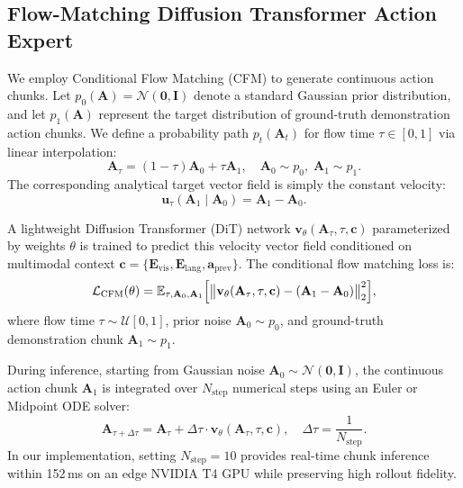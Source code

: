 \subsection{Flow-Matching Diffusion Transformer Action Expert}
We employ Conditional Flow Matching (CFM) \cite{peebles2023scalable,black2024pi_0} to generate continuous action chunks. Let $p_0(\mathbf{A}) = \mathcal{N}(\mathbf{0}, \mathbf{I})$ denote a standard Gaussian prior distribution, and let $p_1(\mathbf{A})$ represent the target distribution of ground-truth demonstration action chunks. We define a probability path $p_t(\mathbf{A}_t)$ for flow time $\tau \in [0, 1]$ via linear interpolation:
\begin{equation}
\mathbf{A}_\tau = (1 - \tau)\mathbf{A}_0 + \tau \mathbf{A}_1, \quad \mathbf{A}_0 \sim p_0, \; \mathbf{A}_1 \sim p_1.
\end{equation}
The corresponding analytical target vector field is simply the constant velocity:
\begin{equation}
\mathbf{u}_\tau(\mathbf{A}_1 \mid \mathbf{A}_0) = \mathbf{A}_1 - \mathbf{A}_0.
\end{equation}

A lightweight Diffusion Transformer (DiT) network $\mathbf{v}_\theta(\mathbf{A}_\tau, \tau, \mathbf{c})$ parameterized by weights $\theta$ is trained to predict this velocity vector field conditioned on multimodal context $\mathbf{c} = \{\mathbf{E}_{\text{vis}}, \mathbf{E}_{\text{lang}}, \mathbf{a}_{\text{prev}}\}$. The conditional flow matching loss is:
\begin{equation}
\label{eq:cfm_loss}
\mathcal{L}_{\text{CFM}}(\theta) = \mathbb{E}_{\tau, \mathbf{A}_0, \mathbf{A}_1} \Bigl[ \bigl\| \mathbf{v}_\theta(\mathbf{A}_\tau, \tau, \mathbf{c}) - (\mathbf{A}_1 - \mathbf{A}_0) \bigr\|_2^2 \Bigr],
\end{equation}
where flow time $\tau \sim \mathcal{U}[0, 1]$, prior noise $\mathbf{A}_0 \sim p_0$, and ground-truth demonstration chunk $\mathbf{A}_1 \sim p_1$.

During inference, starting from Gaussian noise $\mathbf{A}_0 \sim \mathcal{N}(\mathbf{0}, \mathbf{I})$, the continuous action chunk $\mathbf{A}_1$ is integrated over $N_{\text{step}}$ numerical steps using an Euler or Midpoint ODE solver:
\begin{equation}
\mathbf{A}_{\tau + \Delta \tau} = \mathbf{A}_\tau + \Delta \tau \cdot \mathbf{v}_\theta\left(\mathbf{A}_\tau, \tau, \mathbf{c}\right), \quad \Delta \tau = \frac{1}{N_{\text{step}}}.
\end{equation}
In our implementation, setting $N_{\text{step}} = 10$ provides real-time chunk inference within 152\,ms on an edge NVIDIA T4 GPU while preserving high rollout fidelity.

